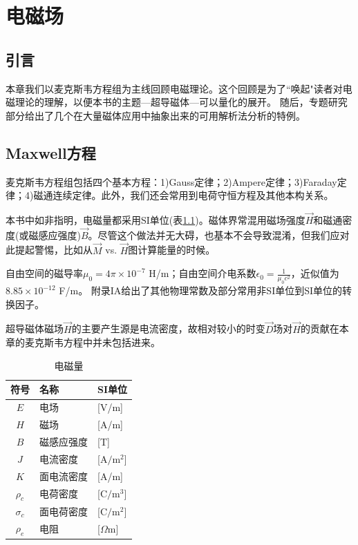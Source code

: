 \chapter{电磁场}
\section{引言}
本章我们以麦克斯韦方程组为主线回顾电磁理论。这个回顾是为了``唤起"读者对电磁理论的理解，以便本书的主题---超导磁体---可以量化的展开。
随后，专题研究部分给出了几个在大量磁体应用中抽象出来的可用解析法分析的特例。
\section{Maxwell方程}
麦克斯韦方程组包括四个基本方程：1)Gauss定律；2)Ampere定律；3)Faraday定律；4)磁通连续定律。此外，我们还会常用到电荷守恒方程及其他本构关系。

本书中如非指明，电磁量都采用SI单位(表\ref{emquantity})。磁体界常混用磁场强度$\vec{H}$和磁通密度(或磁感应强度)$\vec{B}$。尽管这个做法并无大碍，也基本不会导致混淆，但我们应对此提起警惕，比如从$\vec{M}$ vs. $\vec{H}$图计算能量的时候。

自由空间的磁导率$\mu_0=4\pi \times 10^{-7}$ H/m；自由空间介电系数$\epsilon_0=\frac{1}{\mu_0c^2}$，近似值为$8.85\times 10^{-12}$ F/m。
附录IA给出了其他物理常数及部分常用非SI单位到SI单位的转换因子。

超导磁体磁场$\vec{H}$的主要产生源是电流密度，故相对较小的时变$\vec{D}$场对$\vec{H}$的贡献在本章的麦克斯韦方程中并未包括进来。

\begin{table}[htbp]\small
  \centering
  \caption{电磁量} \label{emquantity}
\begin{tabular}{|c||l|l|}
  \hline
  符号 & 名称 & SI单位 \\ \hline
  $E$&电场&[V/m] \\ \hline
  $H$&磁场&[A/m] \\ \hline
  $B$&磁感应强度&[T]\\ \hline
  $J$&电流密度&[$\mathrm{A/m^2}$] \\ \hline
  $K$&面电流密度&[A/m]\\ \hline
  $\rho_c$&电荷密度&[$\mathrm{C/m^3}$]\\ \hline
  $\sigma_c$&面电荷密度&[$\mathrm{C/m^2}]$\\ \hline
  $\rho_e$&电阻&[$\Omega$m]\\
  \hline
\end{tabular}
\end{table}

